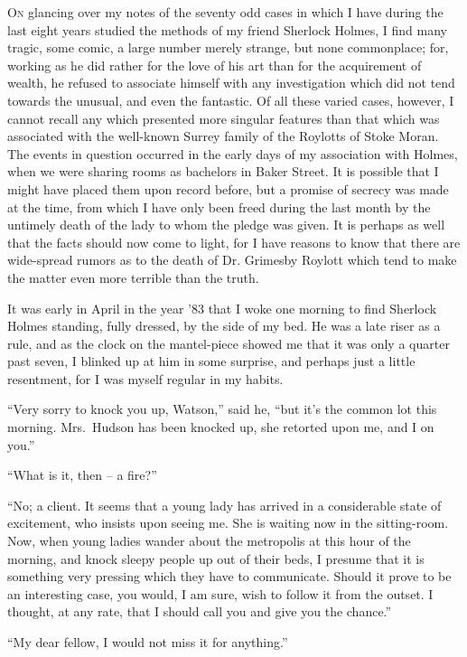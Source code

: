 \textsc{On} glancing over my notes of the seventy odd cases
in which I have during the last eight years studied
the methods of my friend Sherlock Holmes, I find
many tragic, some comic, a large number merely
strange, but none commonplace; for, working as he did rather
for the love of his art than for the acquirement of wealth,
he refused to associate himself with any investigation which
did not tend towards the unusual, and even the fantastic.
Of all these varied cases, however, I cannot recall any which
presented more singular features than that which was associated
with the well-known Surrey family of the Roylotts of
Stoke Moran. The events in question occurred in the early
days of my association with Holmes, when we were sharing
rooms as bachelors in Baker Street. It is possible that I
might have placed them upon record before, but a promise of
secrecy was made at the time, from which I have only been
freed during the last month by the untimely death of the lady
to whom the pledge was given. It is perhaps as well that the
facts should now come to light, for I have reasons to know
that there are wide-spread rumors as to the death of Dr.
Grimesby Roylott which tend to make the matter even more
terrible than the truth.

It was early in April in the year ’83 that I woke one morning
to find Sherlock Holmes standing, fully dressed, by the
side of my bed. He was a late riser as a rule, and as the
clock on the mantel-piece showed me that it was only a quarter
past seven, I blinked up at him in some surprise, and
perhaps just a little resentment, for I was myself regular in my
habits.

“Very sorry to knock you up, Watson,” said he, “but it’s
the common lot this morning. Mrs.~Hudson has been knocked
up, she retorted upon me, and I on you.”

“What is it, then -- a fire?”

“No; a client. It seems that a young lady has arrived in
a considerable state of excitement, who insists upon seeing
me. She is waiting now in the sitting-room. Now, when
young ladies wander about the metropolis at this hour of the
morning, and knock sleepy people up out of their beds, I presume
that it is something very pressing which they have to
communicate. Should it prove to be an interesting case, you
would, I am sure, wish to follow it from the outset. I thought,
at any rate, that I should call you and give you the chance.”

“My dear fellow, I would not miss it for anything.”

